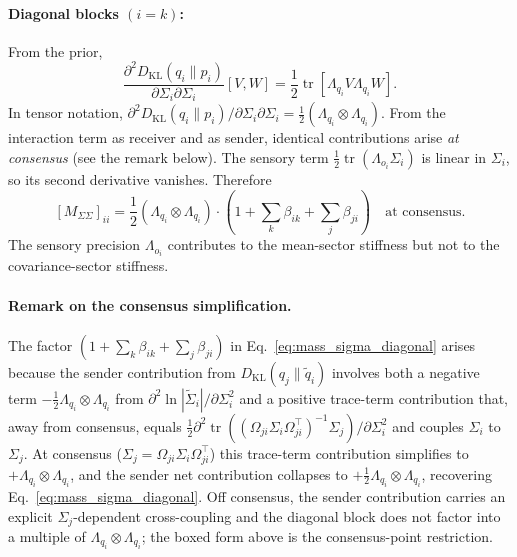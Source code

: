 \paragraph{Diagonal blocks $(i = k)$:} From the prior,
\begin{equation}
\frac{\partial^2 D_{\mathrm{KL}}(q_i \| p_i)}{\partial \Sigma_i \partial \Sigma_i}[V, W] = \frac{1}{2}\operatorname{tr}[\Lambda_{q_i} V \Lambda_{q_i} W].
\end{equation}
In tensor notation, $\partial^2 D_{\mathrm{KL}}(q_i \| p_i)/\partial \Sigma_i \partial \Sigma_i = \frac{1}{2}(\Lambda_{q_i} \otimes \Lambda_{q_i})$. From the interaction term as receiver and as sender, identical contributions arise \emph{at consensus} (see the remark below). The sensory term $\frac{1}{2}\operatorname{tr}(\Lambda_{o_i}\Sigma_i)$ is linear in $\Sigma_i$, so its second derivative vanishes. Therefore
\begin{equation}
\boxed{[M_{\Sigma\Sigma}]_{ii} = \frac{1}{2}(\Lambda_{q_i} \otimes \Lambda_{q_i}) \cdot \left(1 + \sum_k \beta_{ik} + \sum_j \beta_{ji}\right) \quad \text{at consensus.}}
\label{eq:mass_sigma_diagonal}
\end{equation}
The sensory precision $\Lambda_{o_i}$ contributes to the mean-sector stiffness but not to the covariance-sector stiffness.

\paragraph{Remark on the consensus simplification.} The factor $(1 + \sum_k \beta_{ik} + \sum_j \beta_{ji})$ in Eq.~\eqref{eq:mass_sigma_diagonal} arises because the sender contribution from $D_{\mathrm{KL}}(q_j \| \tilde{q}_i)$ involves both a negative term $-\frac{1}{2}\Lambda_{q_i} \otimes \Lambda_{q_i}$ from $\partial^2 \ln |\tilde{\Sigma}_i|/\partial \Sigma_i^2$ and a positive trace-term contribution that, away from consensus, equals $\frac{1}{2}\partial^2 \operatorname{tr}((\Omega_{ji}\Sigma_i\Omega_{ji}^\top)^{-1}\Sigma_j)/\partial\Sigma_i^2$ and couples $\Sigma_i$ to $\Sigma_j$. At consensus ($\Sigma_j = \Omega_{ji}\Sigma_i\Omega_{ji}^\top$) this trace-term contribution simplifies to $+\Lambda_{q_i} \otimes \Lambda_{q_i}$, and the sender net contribution collapses to $+\frac{1}{2}\Lambda_{q_i}\otimes\Lambda_{q_i}$, recovering Eq.~\eqref{eq:mass_sigma_diagonal}. Off consensus, the sender contribution carries an explicit $\Sigma_j$-dependent cross-coupling and the diagonal block does not factor into a multiple of $\Lambda_{q_i}\otimes\Lambda_{q_i}$; the boxed form above is the consensus-point restriction.

